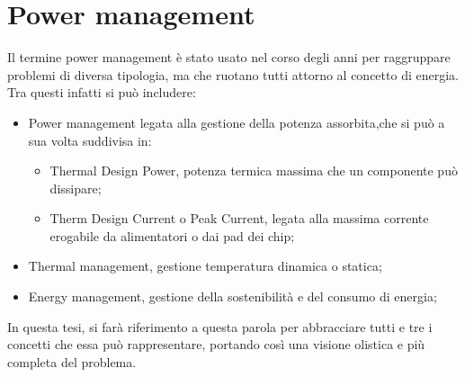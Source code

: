 \chapter{Power management}
Il termine power management è stato usato nel corso degli anni per raggruppare problemi di diversa tipologia, ma che ruotano tutti attorno al concetto di energia.
Tra questi infatti si può includere:
\begin{itemize}
    \item Power management legata alla gestione della potenza assorbita,che si può a sua volta suddivisa in:
    \begin{itemize}
        \item Thermal Design Power, potenza termica massima che un componente può dissipare;
        \item Therm Design Current o Peak Current, legata alla massima corrente erogabile da alimentatori o dai pad dei chip; %
    \end{itemize}
    \item Thermal management, gestione temperatura dinamica o statica;
    \item Energy management, gestione della sostenibilità e del consumo di energia;
\end{itemize}

In questa tesi, si farà riferimento a questa parola per abbracciare tutti e tre i concetti che essa può rappresentare, portando così una visione olistica e più completa del problema.

